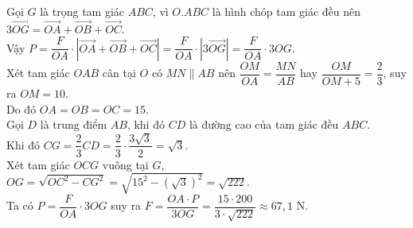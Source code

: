 \begin{ex}
{		Gọi $G$ là trọng tam giác $ABC$, vì $O.ABC$ là hình chóp tam giác đều nên $3\overrightarrow{OG}=\overrightarrow{OA}+\overrightarrow{OB}+\overrightarrow{OC}$.\\
		Vậy $P=\dfrac{F}{OA}\cdot\left|\overrightarrow{OA}+\overrightarrow{OB}+\overrightarrow{OC}\right|=\dfrac{F}{OA}\cdot \left|3\overrightarrow{OG}\right|=\dfrac{F}{OA}\cdot 3OG$.\\
		Xét tam giác $OAB$ cân tại $O$ có $MN\parallel AB$ nên $\dfrac{OM}{OA}=\dfrac{MN}{AB}$ hay $\dfrac{OM}{OM+5}=\dfrac{2}{3}$, suy ra $OM=10$.\\
		Do đó $OA=OB=OC=15$.\\
		Gọi $D$ là trung điểm $AB$, khi đó $CD$ là đường cao của tam giác đều $ABC$.\\
		Khi đó $CG=\dfrac{2}{3}CD=\dfrac{2}{3}\cdot \dfrac{3\sqrt{3}}{2}=\sqrt{3}$. \\
		Xét tam giác $OCG$ vuông tại $G$, $OG=\sqrt{OC^2-CG^2}=\sqrt{15^2-\left(\sqrt{3}\right)^2}=\sqrt{222}$.\\
		Ta có $P=\dfrac{F}{OA}\cdot 3OG$ suy ra $F=\dfrac{OA\cdot P}{3OG}=\dfrac{15\cdot 200}{3\cdot \sqrt{222}}\approx 67{,}1$ N.	
	}
\end{ex}

